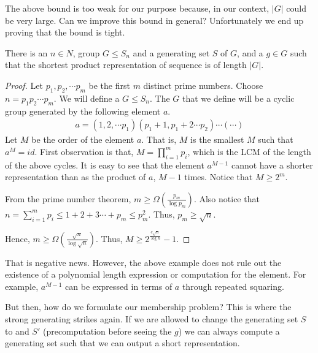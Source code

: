 The above bound is too weak for our purpose because, in our context, $|G|$ could be very large. Can we improve this bound in general?
Unfortunately we end up proving that the bound is tight.

\begin{proposition}
There is an $n \in N$, group $G \le S_n$ and a generating set $S$ of $G$, and a $g \in G$ such that the shortest product representation of 
sequence is of length $|G|$. \label{prop:repr-large}
\end{proposition}
\begin{proof}
Let $p_1, p_2, \cdots p_m$ be the first $m$ distinct prime numbers.
Choose $n = p_1p_2 \cdots p_m$. We will define a $G \le S_n$. The $G$ that we define will be a cyclic group generated by the following element $a$.
\begin{align}
a = (1, 2, \cdots p_1) (p_1+1, p_1+2 \cdots p_2) \cdots (\cdots)
\end{align}
Let $M$ be the order of the element $a$. That is, $M$ is the smallest $M$ such that $a^M = id$. First observation is that, $M = \prod\limits_{i=1}^m p_i$, which is the LCM of the length of the above cycles. It is easy to see that the element $a^{M-1}$ cannot have a shorter representation than as the product of $a$, $M-1$ times. Notice that $M \ge 2^m$.

From the prime number theorem, $m \geq \Omega(\frac{p_m}{\log p_m})$.
Also notice that $n = \sum\limits_{i = 1}^m p_i \leq 1 + 2 + 3 \cdots + p_m \leq p_m^2$. Thus, $p_m \geq \sqrt n$.

Hence, $m \geq \Omega(\frac{\sqrt n}{\log \sqrt n})$. Thus, $M \geq 2^{\frac{c \sqrt n}{\log n }} - 1$.
\end{proof}

That is negative news. However, the above example does not rule out the existence of a polynomial length expression or computation for the element. For example, $a^{M-1}$ can be expressed in terms of
$a$ through repeated squaring.

But then, how do we formulate our membership problem? This is where the strong generating strikes again. If we are allowed to change the generating set $S$ to and $S'$ (precomputation before seeing the $g$) we can always compute a generating set such that we can output a short representation. 


